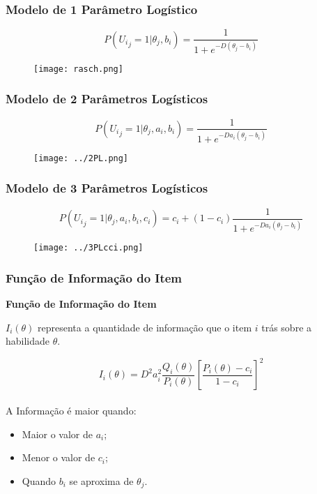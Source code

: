 \documentclass{beamer}
\begin{document}
	\begin{frame}
		
		\frametitle{Modelo de 1 Parâmetro Logístico}
		
		\[
				P({U_i}_j = 1|{\theta}_j, b_i) = 
				\frac{1}{1+e^{-D(\theta_j - b_i)}}
		\]
		\begin{figure}
		\texttt{[image: rasch.png]}
		\end{figure}

	\end{frame}
	
	
	\begin{frame}
		
		\frametitle{Modelo de 2 Parâmetros Logísticos}
		
		\[
			P({U_i}_j = 1|{\theta}_j, a_i, b_i) =
			\frac{1}{1+e^{-Da_i(\theta_j- b_i)}}
		\]
		
		\begin{figure}
			\texttt{[image: ../2PL.png]}
		\end{figure}

		
	\end{frame}
	
	
	\begin{frame}
		
		\frametitle{Modelo de 3 Parâmetros Logísticos}
		\[
			P({U_i}_j = 1|{\theta}_j, a_i, b_i, c_i) =
			c_i+(1-c_i)\frac{1}{1+e^{-Da_i(\theta_j- b_i)}}
		\]
		\begin{figure}
			\texttt{[image: ../3PLcci.png]}
		\end{figure}

		
	\end{frame}

	\begin{frame}
		
		\frametitle{Função de Informação do Item}
		
		\begin{center}
			\textbf{Função de Informação do Item}
		\end{center}
		
		$I_i(\theta)$ representa a quantidade de informação que o item $i$ trás sobre a
		habilidade $\theta$.
		
		\[
		I_i(\theta) =  D^2 a_i^2\frac{Q_i(\theta)}{P_i(\theta)} \left[\frac{P_i(\theta) - c_i}{1 - c_i}\right]^2
		\] \\ \pause	
				A Informação é maior quando:
		
		\begin{itemize}
			\item<1-> Maior o valor de $a_i$;
			\item<1-> Menor o valor de $c_i$;
			\item<1-> Quando $b_i$ se aproxima de $\theta_j$.
			
		\end{itemize}

	\end{frame}
	
\end{document}
